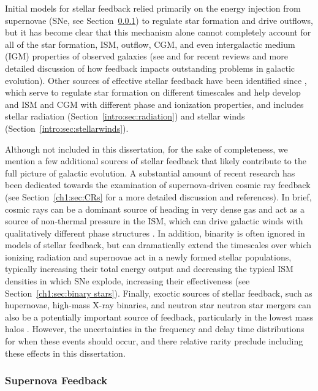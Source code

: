 Initial models for stellar feedback relied primarily on the energy injection from supernovae (SNe, see Section~\ref{intro:sec:supernovae}) to regulate star formation and drive outflows, but it has become clear that this mechanism alone cannot completely account for all of the star formation, ISM, outflow, CGM, and even intergalactic medium (IGM) properties of observed galaxies (see \cite{SomervilleDave2015} and \cite{NaabOstriker2017} for recent reviews and more detailed discussion of how feedback impacts outstanding problems in galactic evolution). Other sources of effective stellar feedback have been identified since \citep[e.g.][]{Agertz2013}, which serve to regulate star formation on different timescales and help develop and ISM and CGM with different phase and ionization properties, and includes stellar radiation (Section~\ref{intro:sec:radiation}) and stellar winds (Section~\ref{intro:sec:stellarwinds}). 

Although not included in this dissertation, for the sake of completeness, we mention a few additional sources of stellar feedback that likely contribute to the full picture of galactic evolution. A substantial amount of recent research has been dedicated towards the examination of supernova-driven cosmic ray feedback (see Section~\ref{ch1:sec:CRs} for a more detailed discussion and references). In brief, cosmic rays can be a dominant source of heading in very dense gas and act as a source of non-thermal pressure in the ISM, which can drive galactic winds with qualitatively different phase structures \citep[e.g.][]{SalemBryanCorlies}. In addition, binarity is often ignored in models of stellar feedback, but can dramatically extend the timescales over which ionizing radiation and supernovae act in a newly formed stellar populations, typically increasing their total energy output and decreasing the typical ISM densities in which SNe explode, increasing their effectiveness (see Section~\ref{ch1:sec:binary stars}). Finally, exoctic sources of stellar feedback, such as hupernovae, high-mass X-ray binaries, and neutron star neutron star mergers can also be a potentially important source of feedback, particularly in the lowest mass halos \citep[e.g.][]{Artale2015}. However, the uncertainties in the frequency and delay time distributions for when these events should occur, and there relative rarity preclude including these effects in this dissertation.

\subsubsection{Supernova Feedback}
\label{intro:sec:supernovae}

